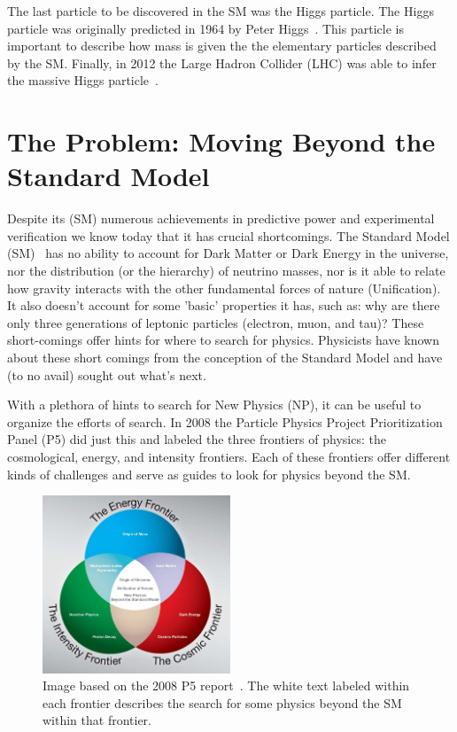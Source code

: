 The last particle to be discovered in the SM was the Higgs particle.
The Higgs particle was originally predicted in 1964 by Peter Higgs~\citep{HIGGS1964132}.
This particle is important to describe how mass is given the the elementary particles described by the SM.
Finally, in 2012 the Large Hadron Collider (LHC) was able to infer the massive Higgs particle~\citep{higgs_discovery_20121}.

\section{The Problem: Moving Beyond the Standard Model}

Despite its (SM) numerous achievements in predictive power and experimental verification we know today that it has crucial shortcomings.
The Standard Model (SM)~\citep{GLASHOW1961579, salam1964electromagnetic, weinberg1967model} has no ability to account for Dark Matter or Dark Energy in the universe, nor the distribution (or the hierarchy) of neutrino masses, nor is it able to relate how gravity interacts with the other fundamental forces of nature (Unification).
It also doesn't account for some 'basic' properties it has, such as: why are there only three generations of leptonic particles (electron, muon, and tau)?
These short-comings offer hints for where to search for physics.
Physicists have known about these short comings from the conception of the Standard Model and have (to no avail) sought out what's next.

With a plethora of hints to search for New Physics (NP), it can be useful to organize the efforts of search.
In 2008 the Particle Physics Project Prioritization Panel (P5) did just this and labeled the three frontiers of physics: the cosmological, energy, and intensity frontiers.
Each of these frontiers offer different kinds of challenges and serve as guides to look for physics beyond the SM.

\begin{figure}[]
\centering
\includegraphics[width=0.5\textwidth]{images/frontiers_physics.jpg}
\caption{Image based on the 2008 P5 report~\citep{intensityfrontier2012_Hewett}. The white text labeled within each frontier describes the search for some physics beyond the SM within that frontier.}
\end{figure}

